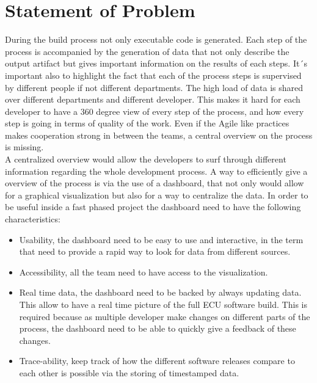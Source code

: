 \documentclass[../main.tex]{subfiles}
\begin{document}
\section{Statement of Problem}
During the build process not only executable code is generated. Each step of the process is accompanied by the generation of data that not only describe the output artifact but gives important information on the results of each steps. It´s important also to highlight the fact that each of the process steps is supervised by different people if not different departments. The high load of data is shared over different departments and different developer. This makes it hard for each developer to have a 360 degree view of every step of the process, and how every step is going in terms of quality of the work. Even if the Agile like practices makes cooperation strong in between the teams,  a central overview on the process is missing.\\
A centralized overview would allow the developers to surf through different information regarding the whole development process. A way to efficiently give a overview of the process is via the use of a dashboard, that not only would allow for a graphical visualization but also for a way to centralize the data. In order to be useful inside a fast phased project the dashboard need to have the following characteristics:
\begin{itemize}
    \item Usability, the dashboard need to be easy to use and interactive, in the term that need to provide a rapid way to look for data from different sources. 
    \item Accessibility, all the team need to have access to the visualization.
    \item Real time data, the dashboard need to be backed by always updating data. This allow to have a real time picture of the full \gls{ECU} software build. This is required because as multiple developer make changes on different parts of the process, the dashboard need to be able to quickly give a feedback of these changes.
    \item Trace-ability, keep track of how the different software releases compare to each other is possible via the storing of timestamped data. 
\end{itemize}
\end{document}
